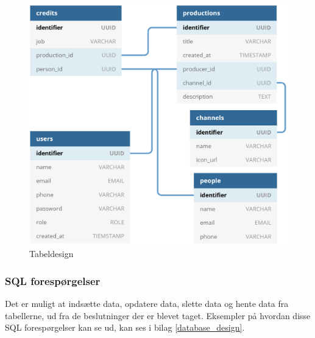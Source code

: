 \begin{figure}[ht]
    \centering
    \includegraphics[scale=0.2]{figures/database_design.PNG}  
    \caption{Tabeldesign}
    \label{fig:tabledesign}
\end{figure}{}


\subsubsection{SQL forespørgelser}
Det er muligt at indsætte data, opdatere data, slette data og hente data fra tabellerne, ud fra de beslutninger der er blevet taget. Eksempler på hvordan disse SQL forespørgelser kan se ud, kan ses i bilag \ref{database_design}.